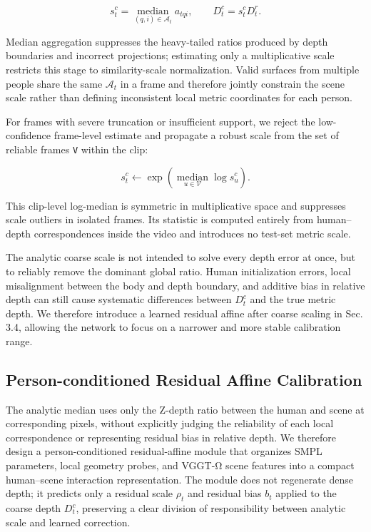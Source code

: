 \documentclass{article}
\begin{document}
\begin{equation}
s_t^c=\operatorname*{median}_{(q,i)\in\mathcal{A}_t}a_{tqi},
\qquad D_t^c=s_t^cD_t^r.
\label{eq:coarse-scale}
\end{equation}

Median aggregation suppresses the heavy-tailed ratios produced by depth boundaries and incorrect projections; estimating only a multiplicative scale restricts this stage to similarity-scale normalization. Valid surfaces from multiple people share the same $\mathcal{A}_t$ in a frame and therefore jointly constrain the scene scale rather than defining inconsistent local metric coordinates for each person.

For frames with severe truncation or insufficient support, we reject the low-confidence frame-level estimate and propagate a robust scale from the set of reliable frames \texttt{V} within the clip:

\begin{equation}
s_t^c\leftarrow
\exp\!\left(\operatorname*{median}_{u\in\mathcal{V}}\log s_u^c\right).
\label{eq:scale-fallback}
\end{equation}

This clip-level log-median is symmetric in multiplicative space and suppresses scale outliers in isolated frames. Its statistic is computed entirely from human--depth correspondences inside the video and introduces no test-set metric scale.

The analytic coarse scale is not intended to solve every depth error at once, but to reliably remove the dominant global ratio. Human initialization errors, local misalignment between the body and depth boundary, and additive bias in relative depth can still cause systematic differences between $D_t^c$ and the true metric depth. We therefore introduce a learned residual affine after coarse scaling in Sec. 3.4, allowing the network to focus on a narrower and more stable calibration range.

\subsection{Person-conditioned Residual Affine Calibration}

The analytic median uses only the Z-depth ratio between the human and scene at corresponding pixels, without explicitly judging the reliability of each local correspondence or representing residual bias in relative depth. We therefore design a person-conditioned residual-affine module that organizes SMPL parameters, local geometry probes, and VGGT-Ω scene features into a compact human--scene interaction representation. The module does not regenerate dense depth; it predicts only a residual scale $\rho_t$ and residual bias $b_t$ applied to the coarse depth $D_t^c$, preserving a clear division of responsibility between analytic scale and learned correction.
\end{document}
